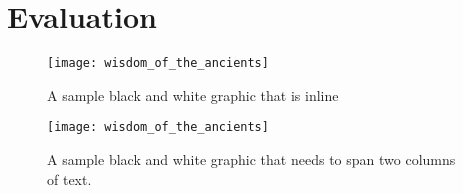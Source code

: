 \section{Evaluation}

\begin{figure}
\centering
\texttt{[image: wisdom\_of\_the\_ancients]}
\caption{A sample black and white graphic
that is inline}
\end{figure}

\begin{figure*}
\centering
\texttt{[image: wisdom\_of\_the\_ancients]}
\caption{A sample black and white graphic
that needs to span two columns of text.}
\end{figure*}
